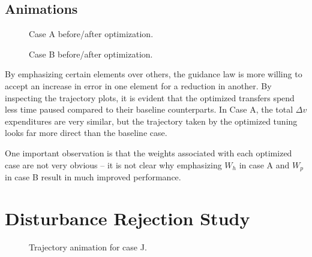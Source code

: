 \subsection{Animations}
\begin{figure}[H]
    \begin{animateinline}[controls,width=\linewidth, loop]{10}
    \end{animateinline}
    \caption{Case A before/after optimization.}
    \label{fig:benchmark_optim_anim}
\end{figure}
\begin{figure}[H]
    \begin{animateinline}[controls,width=\linewidth, loop]{10}
    \end{animateinline}
    \caption{Case B before/after optimization.}
    \label{fig:g_optim_anim}
\end{figure}

By emphasizing certain elements over others, the guidance law is more willing to accept an increase in error in one element for a reduction in another. By inspecting the trajectory plots, it is evident that the optimized transfers spend less time paused compared to their baseline counterparts. In Case A, the total \(\Delta v\) expenditures are very similar, but the trajectory taken by the optimized tuning looks far more direct than the baseline case.

One important observation is that the weights associated with each optimized case are not very obvious -- it is not clear why emphasizing \(W_h\) in case A and \(W_p\) in case B result in much improved performance.


\section{Disturbance Rejection Study}

\begin{figure}[H]
    \caption{Trajectory animation for case J.}
    \label{fig:anim_j}
\end{figure}

